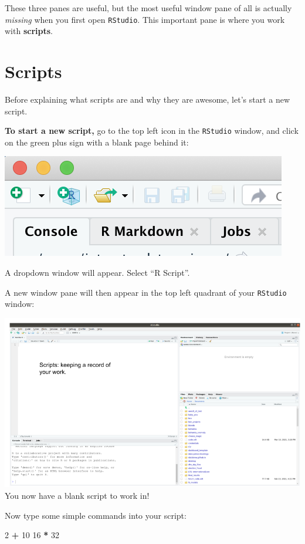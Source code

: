 \documentclass[
]{book}
\newenvironment{Shaded}{\begin{snugshade}}{\end{snugshade}}
\newcommand{\DecValTok}[1]{\textcolor[rgb]{0.00,0.00,0.81}{#1}}
\newcommand{\OperatorTok}[1]{\textcolor[rgb]{0.81,0.36,0.00}{\textbf{#1}}}
\newcommand{\StringTok}[1]{\textcolor[rgb]{0.31,0.60,0.02}{#1}}
\begin{document}
These three panes are useful, but the most useful window pane of all is actually \emph{missing} when you first open \texttt{RStudio}. This important pane is where you work with \textbf{scripts}.

\hypertarget{scripts}{%
\section*{Scripts}\label{scripts}}

Before explaining what scripts are and why they are awesome, let's start a new script.

\textbf{To start a new script,} go to the top left icon in the \texttt{RStudio} window, and click on the green plus sign with a blank page behind it:

\includegraphics{img/rstudio_newscript.png}

A dropdown window will appear. Select ``R Script''.

A new window pane will then appear in the top left quadrant of your \texttt{RStudio} window:

\includegraphics{img/rstudio_scripts.png}
You now have a blank script to work in!

Now type some simple commands into your script:

\begin{Shaded}
\begin{Highlighting}[]
\DecValTok{2}  \OperatorTok{+}\StringTok{ }\DecValTok{10}
\DecValTok{16} \OperatorTok{*}\StringTok{ }\DecValTok{32}
\end{Highlighting}
\end{Shaded}
\end{document}
